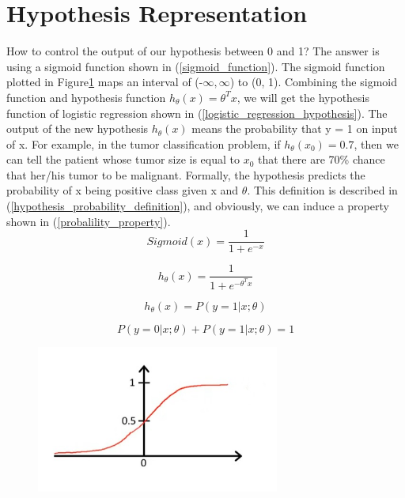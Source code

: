 \documentclass{article}
\begin{document}
\section{Hypothesis Representation}
How to control the output of our hypothesis between 0 and 1? The answer is using a sigmoid function shown in (\ref{sigmoid_function}). The sigmoid function plotted in Figure\ref{sigmoid_function_plotting} maps an interval of (-$\infty, \infty$) to (0, 1). Combining the sigmoid function and hypothesis function $h_{\theta}(x) = \theta^{T}x$, we will get the hypothesis function of logistic regression shown in (\ref{logistic_regression_hypothesis}). The output of the new hypothesis $h_{\theta}(x)$  means the probability that y = 1 on input of x. For example, in the tumor classification problem, if $h_{\theta}(x_{0}) = 0.7$, then we can tell the patient whose tumor size is equal to $x_{0}$ that there are 70\% chance that her/his tumor to be malignant. Formally, the hypothesis predicts the probability of x being positive class given x and $\theta$. This definition is described in (\ref{hypothesis_probability_definition}), and obviously, we can induce a property shown in (\ref{probalility_property}).
\begin{equation}\label{sigmoid_function}
Sigmoid(x) = \frac{1}{1 + e^{-x}}
\end{equation}

\begin{equation}\label{logistic_regression_hypothesis}
h_{\theta}(x) = \frac{1}{1 + e^{-\theta^{T}x}}
\end{equation}

\begin{equation}\label{hypothesis_probability_definition}
h_{\theta}(x) = P(y = 1|x;\theta)
\end{equation}

\begin{equation}\label{probalility_property}
P(y = 0|x;\theta) + P(y = 1|x;\theta) = 1
\end{equation}

\begin{figure}[ht]
  \centering
  \includegraphics[width=8cm]{Figure2.jpg}\\
  \caption{}\label{sigmoid_function_plotting}
\end{figure}
\end{document}
